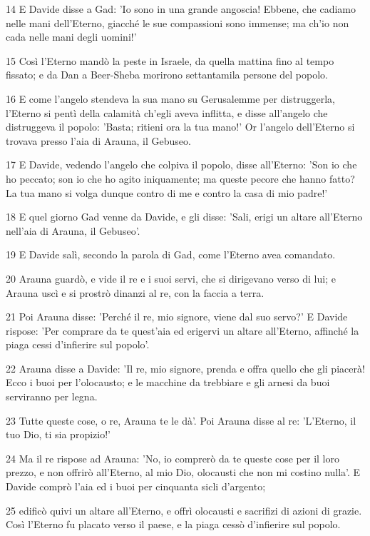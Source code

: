 \par 14 E Davide disse a Gad: 'Io sono in una grande angoscia! Ebbene, che cadiamo nelle mani dell'Eterno, giacché le sue compassioni sono immense; ma ch'io non cada nelle mani degli uomini!'
\par 15 Così l'Eterno mandò la peste in Israele, da quella mattina fino al tempo fissato; e da Dan a Beer-Sheba morirono settantamila persone del popolo.
\par 16 E come l'angelo stendeva la sua mano su Gerusalemme per distruggerla, l'Eterno si pentì della calamità ch'egli aveva inflitta, e disse all'angelo che distruggeva il popolo: 'Basta; ritieni ora la tua mano!' Or l'angelo dell'Eterno si trovava presso l'aia di Arauna, il Gebuseo.
\par 17 E Davide, vedendo l'angelo che colpiva il popolo, disse all'Eterno: 'Son io che ho peccato; son io che ho agito iniquamente; ma queste pecore che hanno fatto? La tua mano si volga dunque contro di me e contro la casa di mio padre!'
\par 18 E quel giorno Gad venne da Davide, e gli disse: 'Sali, erigi un altare all'Eterno nell'aia di Arauna, il Gebuseo'.
\par 19 E Davide salì, secondo la parola di Gad, come l'Eterno avea comandato.
\par 20 Arauna guardò, e vide il re e i suoi servi, che si dirigevano verso di lui; e Arauna uscì e si prostrò dinanzi al re, con la faccia a terra.
\par 21 Poi Arauna disse: 'Perché il re, mio signore, viene dal suo servo?' E Davide rispose: 'Per comprare da te quest'aia ed erigervi un altare all'Eterno, affinché la piaga cessi d'infierire sul popolo'.
\par 22 Arauna disse a Davide: 'Il re, mio signore, prenda e offra quello che gli piacerà! Ecco i buoi per l'olocausto; e le macchine da trebbiare e gli arnesi da buoi serviranno per legna.
\par 23 Tutte queste cose, o re, Arauna te le dà'. Poi Arauna disse al re: 'L'Eterno, il tuo Dio, ti sia propizio!'
\par 24 Ma il re rispose ad Arauna: 'No, io comprerò da te queste cose per il loro prezzo, e non offrirò all'Eterno, al mio Dio, olocausti che non mi costino nulla'. E Davide comprò l'aia ed i buoi per cinquanta sicli d'argento;
\par 25 edificò quivi un altare all'Eterno, e offrì olocausti e sacrifizi di azioni di grazie. Così l'Eterno fu placato verso il paese, e la piaga cessò d'infierire sul popolo.


